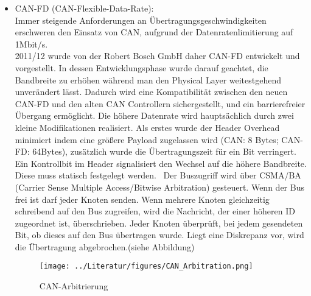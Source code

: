     \begin{itemize}
        \item{CAN-FD (CAN-Flexible-Data-Rate):}\\
        Immer steigende Anforderungen an Übertragungsgeschwindigkeiten erschweren den Einsatz von 
        CAN, aufgrund der Datenratenlimitierung auf 1Mbit/s.\\ 2011/12 wurde von der Robert Bosch GmbH 
        daher CAN-FD entwickelt und vorgestellt. In dessen
        Entwicklungsphase wurde darauf geachtet, die Bandbreite zu erhöhen während man den Physical 
        Layer weitestgehend unverändert lässt. Dadurch wird eine Kompatibilität zwischen den neuen 
        CAN-FD und den alten CAN Controllern sichergestellt, 
        und ein barrierefreier Übergang ermöglicht.
        Die höhere Datenrate wird hauptsächlich durch zwei kleine Modifikationen realisiert. 
        Als erstes wurde der Header Overhead minimiert indem eine größere Payload zugelassen 
        wird (CAN: 8 Bytes; CAN-FD: 64Bytes), zusätzlich wurde die Übertragungszeit für ein Bit 
        verringert.~\cite{LA_CAN_FD1}\\
        Ein Kontrollbit im Header signalisiert den Wechsel auf die höhere Bandbreite. Diese muss statisch 
        festgelegt werden.~\cite{LA_CAN_FD2}
        Der Buszugriff wird über CSMA/BA (Carrier Sense Multiple Access/Bitwise Arbitration) gesteuert.
        Wenn der Bus frei ist darf jeder Knoten senden. Wenn mehrere Knoten gleichzeitig schreibend auf 
        den Bus zugreifen, wird die Nachricht, der einer höheren ID zugeordnet ist, überschrieben. Jeder
        Knoten überprüft, bei jedem gesendeten Bit, ob dieses auf den Bus übertragen wurde. Liegt eine 
        Diskrepanz vor, wird die Übertragung abgebrochen.(siehe Abbildung)~\cite{LA_FR1}\cite{LA_CAN3}

        \begin{figure}
            \texttt{[image: ../Literatur/figures/CAN\_Arbitration.png]}
            \caption[
                https://ieeexplore.ieee.org/mediastore_new/IEEE/content/media/6709841/6719916/6719988/6719988-fig-2-source-large.gif
                ]{CAN-Arbitrierung}
        \end{figure}
    \end{itemize}
   
